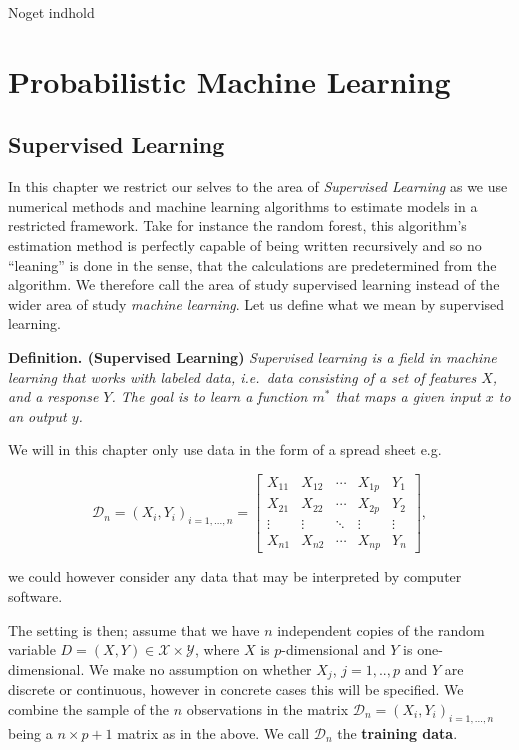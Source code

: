 \documentclass[a4paper,12pt,openany]{book}
\begin{document}
Noget indhold

\hypertarget{probabilistic-machine-learning}{%
\chapter{Probabilistic Machine Learning}\label{probabilistic-machine-learning}}

\hypertarget{supervised-learning}{%
\section{Supervised Learning}\label{supervised-learning}}

In this chapter we restrict our selves to the area of \emph{Supervised Learning} as we use numerical methods and machine learning algorithms to estimate models in a restricted framework. Take for instance the random forest, this algorithm's estimation method is perfectly capable of being written recursively and so no ``leaning'' is done in the sense, that the calculations are predetermined from the algorithm. We therefore call the area of study supervised learning instead of the wider area of study \emph{machine learning}. Let us define what we mean by supervised learning.

\textbf{Definition. (Supervised Learning)} \emph{Supervised learning is a field in machine learning that works with labeled data, i.e.~data consisting of a set of features \(X\), and a response \(Y\). The goal is to learn a function \(m^*\) that maps a given input \(x\) to an output \(y\).}

We will in this chapter only use data in the form of a spread sheet e.g.

\[
\mathcal{D}_n=
\left(X_i, Y_i \right)_{i=1,...,n}=
\left[
\begin{array}{cccc|c}
X_{11} & X_{12} & \cdots & X_{1p} & Y_1\\
X_{21} & X_{22} & \cdots & X_{2p} & Y_2\\
\vdots & \vdots & \ddots & \vdots & \vdots\\
X_{n1} & X_{n2} & \cdots & X_{np} & Y_n
\end{array}
\right],
\]

we could however consider any data that may be interpreted by computer software.

The setting is then; assume that we have \(n\) independent copies of the random variable \(D=(X,Y)\in \mathcal{X}\times \mathcal{Y}\), where \(X\) is \(p\)-dimensional and \(Y\) is one-dimensional. We make no assumption on whether \(X_j\), \(j=1,..,p\) and \(Y\) are discrete or continuous, however in concrete cases this will be specified. We combine the sample of the \(n\) observations in the matrix \(\mathcal{D}_n=(X_i,Y_i)_{i=1,...,n}\) being a \(n\times p+1\) matrix as in the above. We call \(\mathcal{D}_n\) the \textbf{training data}.
\end{document}
